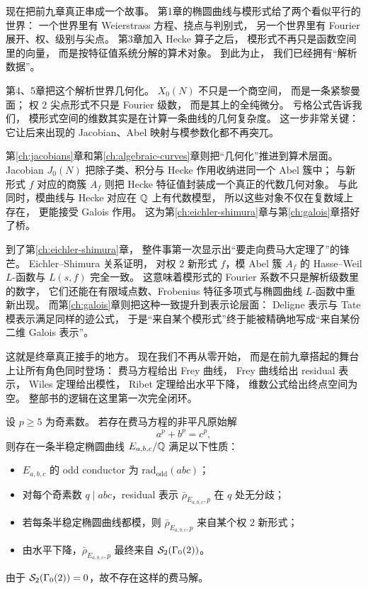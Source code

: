 

现在把前九章真正串成一个故事。
第1章的椭圆曲线与模形式给了两个看似平行的世界：
一个世界里有 Weierstrass 方程、挠点与判别式，
另一个世界里有 Fourier 展开、权、级别与尖点。
第3章加入 Hecke 算子之后，
模形式不再只是函数空间里的向量，
而是按特征值系统分解的算术对象。
到此为止，
我们已经拥有“解析数据”。

第4、5章把这个解析世界几何化。
$X_0(N)$ 不只是一个商空间，
而是一条紧黎曼面；
权 $2$ 尖点形式不只是 Fourier 级数，
而是其上的全纯微分。
亏格公式告诉我们，
模形式空间的维数其实是在计算一条曲线的几何复杂度。
这一步非常关键：
它让后来出现的 Jacobian、Abel 映射与模参数化都不再突兀。

第\ref{ch:jacobians}章和第\ref{ch:algebraic-curves}章则把“几何化”推进到算术层面。
Jacobian $J_0(N)$ 把除子类、积分与 Hecke 作用收纳进同一个 Abel 簇中；
与新形式 $f$ 对应的商簇 $A_f$ 则把 Hecke 特征值封装成一个真正的代数几何对象。
与此同时，模曲线与 Hecke 对应在 $\mathbb{Q}$ 上有代数模型，
所以这些对象不仅在复数域上存在，
更能接受 Galois 作用。
这为第\ref{ch:eichler-shimura}章与第\ref{ch:galois}章搭好了桥。

到了第\ref{ch:eichler-shimura}章，
整件事第一次显示出“要走向费马大定理了”的锋芒。
Eichler--Shimura 关系证明，
对权 $2$ 新形式 $f$，模 Abel 簇 $A_f$ 的 Hasse--Weil $L$-函数与 $L(s,f)$ 完全一致。
这意味着模形式的 Fourier 系数不只是解析级数里的数字，
它们还能在有限域点数、Frobenius 特征多项式与椭圆曲线 $L$-函数中重新出现。
而第\ref{ch:galois}章则把这种一致提升到表示论层面：
Deligne 表示与 Tate 模表示满足同样的迹公式，
于是“来自某个模形式”终于能被精确地写成“来自某份二维 Galois 表示”。

这就是终章真正接手的地方。
现在我们不再从零开始，
而是在前九章搭起的舞台上让所有角色同时登场：
费马方程给出 Frey 曲线，
Frey 曲线给出 residual 表示，
Wiles 定理给出模性，
Ribet 定理给出水平下降，
维数公式给出终点空间为空。
整部书的逻辑在这里第一次完全闭环。

\begin{proposition}[终章的证明框架]
\label{prop:ch10-final-roadmap}
设 $p\ge 5$ 为奇素数。
若存在费马方程的非平凡原始解
\[
  a^p+b^p=c^p,
\]
则存在一条半稳定椭圆曲线 $E_{a,b,c}/\mathbb{Q}$ 满足以下性质：
\begin{itemize}
  \item[(i)] $E_{a,b,c}$ 的 odd conductor 为 $\mathrm{rad}_{\mathrm{odd}}(abc)$；
  \item[(ii)] 对每个奇素数 $q\mid abc$，residual 表示 $\bar\rho_{E_{a,b,c},p}$ 在 $q$ 处无分歧；
  \item[(iii)] 若每条半稳定椭圆曲线都模，则 $\bar\rho_{E_{a,b,c},p}$ 来自某个权 $2$ 新形式；
  \item[(iv)] 由水平下降，$\bar\rho_{E_{a,b,c},p}$ 最终来自 $\mathcal{S}_2(\Gamma_0(2))$。
\end{itemize}
由于 $\mathcal{S}_2(\Gamma_0(2))=0$，故不存在这样的费马解。
\end{proposition}

